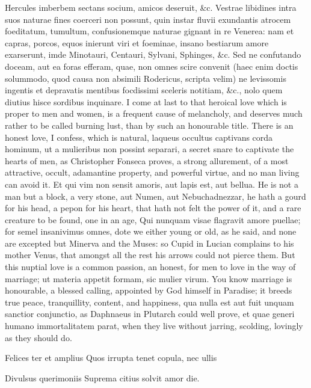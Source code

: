 {Hercules imberbem sectans socium, amicos deseruit, \&c. Vestrae
libidines intra suos naturae fines coerceri non possunt, quin instar
fluvii exundantis atrocem foeditatum, tumultum, confusionemque naturae
gignant in re Venerea: nam et capras, porcos, equos inierunt viri et
foeminae, insano bestiarum amore exarserunt, imde Minotauri, Centauri,
Sylvani, Sphinges, \&c. Sed ne confutando doceam, aut ea foras efferam,
quae, non omnes scire convenit (haec enim doctis solummodo, quod causa
non absimili Rodericus, scripta velim) ne levissomis ingentis et
depravatis mentibus focdissimi sceleris notitiam, \&c., nolo quem
diutius hisce sordibus inquinare.
I come at last to that heroical love which is proper to men and women,
is a frequent cause of melancholy, and deserves much rather to be
called burning lust, than by such an honourable title. There is an
honest love, I confess, which is natural, laqueus occultus captivans
corda hominum, ut a mulieribus non possint separari, a secret snare to
captivate the hearts of men, as Christopher Fonseca proves, a
strong allurement, of a most attractive, occult, adamantine property,
and powerful virtue, and no man living can avoid it. Et qui vim
non sensit amoris, aut lapis est, aut bellua. He is not a man but a
block, a very stone, aut Numen, aut Nebuchadnezzar, he hath a
gourd for his head, a pepon for his heart, that hath not felt the power
of it, and a rare creature to be found, one in an age, Qui nunquam
visae flagravit amore puellae; for semel insanivimus omnes, dote
we either young or old, as he said, and none are excepted but
Minerva and the Muses: so Cupid in Lucian complains to his mother
Venus, that amongst all the rest his arrows could not pierce them. But
this nuptial love is a common passion, an honest, for men to love in
the way of marriage; ut materia appetit formam, sic mulier virum.
You know marriage is honourable, a blessed calling, appointed by
God himself in Paradise; it breeds true peace, tranquillity, content,
and happiness, qua nulla est aut fuit unquam sanctior conjunctio, as
Daphnaeus in Plutarch could well prove, et quae generi humano
immortalitatem parat, when they live without jarring, scolding,
lovingly as they should do.

Felices ter et amplius
Quos irrupta tenet copula, nec ullis

Divulsus querimoniis
Suprema citius solvit amor die.


}
